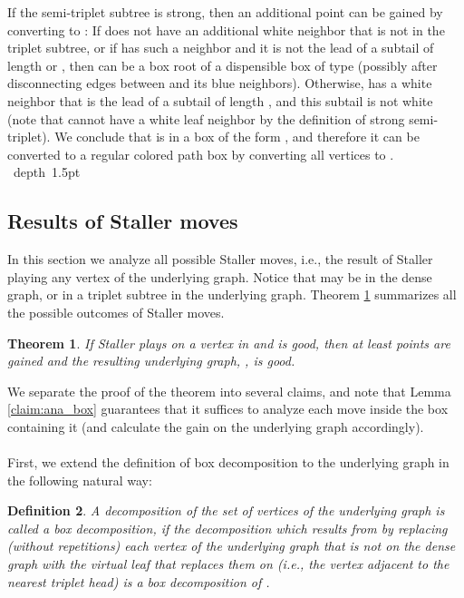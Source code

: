 \documentclass[11pt]{article}
\def\blackslug{\hbox{\hskip 1pt \vrule width 4pt height 8pt
    depth 1.5pt \hskip 1pt}}
\def\QED{\quad\blackslug\lower 8.5pt\null\par}
\newtheorem{theorem}{Theorem}[section]
\newtheorem{definition}[theorem]{Definition}
\theoremstyle{definition}
\begin{document}
If the semi-triplet subtree is strong, then an additional point can be gained by converting  to :
If  does not have an additional white neighbor that is not in the triplet subtree, 
or if  has such a neighbor and it is not the lead of a subtail of length  or , 
then  can be a box root of a dispensible box of type  (possibly after disconnecting edges between  and its blue neighbors). 
Otherwise,  has a white neighbor that is the lead of a subtail of length , and this subtail is not white (note that  cannot have a white leaf neighbor by the definition of strong semi-triplet). 
We conclude that  is in a box of the form , and therefore it can be converted to a regular colored path box by converting all  vertices to .
\QED


\subsection{Results of Staller moves}
\label{sub:an_staller}

In this section we analyze all possible Staller moves, i.e., the result of Staller playing any vertex  of the underlying graph.
Notice that  may be in the dense graph, or in a triplet subtree in the underlying graph.
Theorem \ref{thm:staller_good} summarizes all the possible outcomes of Staller moves.

\begin{theorem}
\label{thm:staller_good}
If Staller plays on a vertex  in  and  is good, then at least  points are gained and the resulting underlying graph, , is good.
\end{theorem}

We separate the proof of the theorem into several claims, and note that Lemma \ref{claim:ana_box} guarantees that it suffices to analyze each move inside the box containing it (and calculate the gain on the underlying graph accordingly).

\paragraph{}

First, we extend the definition of box decomposition to the underlying graph in the following natural way:
\begin{definition}
A decomposition  of the set  of vertices of the underlying graph  is called a \emph{box decomposition}, if the decomposition  which results from  by replacing (without repetitions) each vertex of the underlying graph  that is not on the dense graph  with the virtual leaf that replaces them on  (i.e., the vertex  adjacent to the nearest triplet head) is a box decomposition of .
\end{definition}
\end{document}
